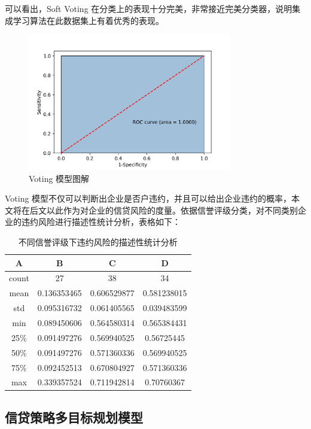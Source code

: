 \documentclass[UTF8]{ctexart}
\begin{document}
可以看出，Soft Voting 在分类上的表现十分完美，非常接近完美分类器，说明集成学习算法在此数据集上有着优秀的表现。

\begin{figure}[H]\centering
	\includegraphics[width=0.8\textwidth,height=0.5\textwidth]{img/1/AUC.png} %
	\caption{Voting 模型图解}
\end{figure}

Voting 模型不仅可以判断出企业是否户违约，并且可以给出企业违约的概率，本文将在后文以此作为对企业的信贷风险的度量。依据信誉评级分类，对不同类别企业的违约风险进行描述性统计分析，表格如下：

\begin{table}[!ht]
	\centering
	\caption{不同信誉评级下违约风险的描述性统计分析}
	\begin{tabular}{c c c c}
		\hline
		A     & B           & C           & D           \\ \hline
		count & 27          & 38          & 34          \\ \hline
		mean  & 0.136353465 & 0.606529877 & 0.581238015 \\ \hline
		std   & 0.095316732 & 0.061405565 & 0.039483599 \\ \hline
		min   & 0.089450606 & 0.564580314 & 0.565384431 \\ \hline
		25\%  & 0.091497276 & 0.569940525 & 0.56725445  \\ \hline
		50\%  & 0.091497276 & 0.571360336 & 0.569940525 \\ \hline
		75\%  & 0.092452513 & 0.670804927 & 0.571360336 \\ \hline
		max   & 0.339357524 & 0.711942814 & 0.70760367  \\ \hline
	\end{tabular}
\end{table}

\subsection{信贷策略多目标规划模型}
\end{document}
